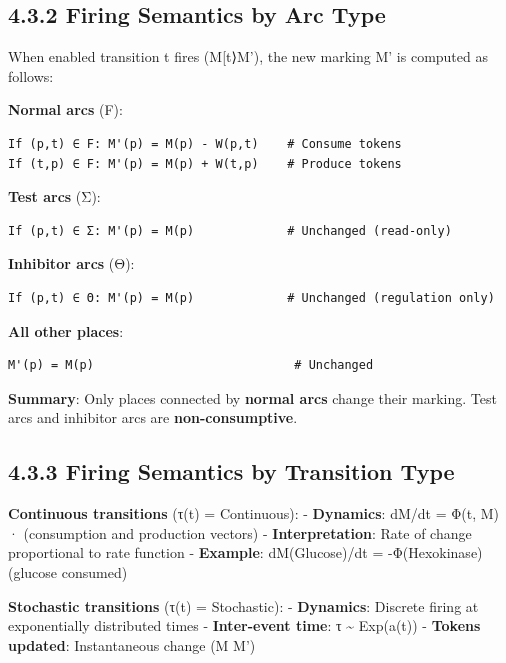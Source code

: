 \hypertarget{firing-semantics-by-arc-type}{%
\subsection{4.3.2 Firing Semantics by Arc
Type}\label{firing-semantics-by-arc-type}}

When enabled transition t fires (M{[}t⟩M'), the new marking M' is
computed as follows:

\textbf{Normal arcs} (F):

\begin{lstlisting}
If (p,t) ∈ F: M'(p) = M(p) - W(p,t)    # Consume tokens
If (t,p) ∈ F: M'(p) = M(p) + W(t,p)    # Produce tokens
\end{lstlisting}

\textbf{Test arcs} (Σ):

\begin{lstlisting}
If (p,t) ∈ Σ: M'(p) = M(p)             # Unchanged (read-only)
\end{lstlisting}

\textbf{Inhibitor arcs} (Θ):

\begin{lstlisting}
If (p,t) ∈ Θ: M'(p) = M(p)             # Unchanged (regulation only)
\end{lstlisting}

\textbf{All other places}:

\begin{lstlisting}
M'(p) = M(p)                            # Unchanged
\end{lstlisting}

\textbf{Summary}: Only places connected by \textbf{normal arcs} change
their marking. Test arcs and inhibitor arcs are
\textbf{non-consumptive}.

\hypertarget{firing-semantics-by-transition-type}{%
\subsection{4.3.3 Firing Semantics by Transition
Type}\label{firing-semantics-by-transition-type}}

\textbf{Continuous transitions} (τ(t) = Continuous): -
\textbf{Dynamics}: dM/dt = Φ(t, M) · (consumption and production
vectors) - \textbf{Interpretation}: Rate of change proportional to rate
function - \textbf{Example}: dM(Glucose)/dt = -Φ(Hexokinase) (glucose
consumed)

\textbf{Stochastic transitions} (τ(t) = Stochastic): -
\textbf{Dynamics}: Discrete firing at exponentially distributed times -
\textbf{Inter-event time}: τ \textasciitilde{} Exp(a(t)) -
\textbf{Tokens updated}: Instantaneous change (M \textrightarrow M')

